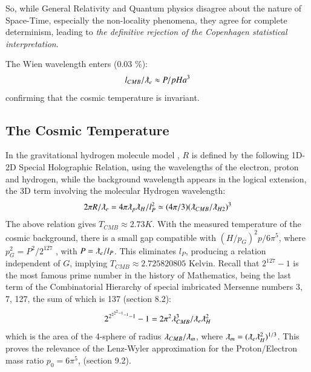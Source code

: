 \documentclass[twoside,draft]{article}
\begin{document}
\begin{sloppypar}
So, while General Relativity and Quantum physics disagree about the nature of Space-Time, especially the non-locality phenomena, they agree for complete determinism, leading to \textit{the definitive rejection of the
Copenhagen statistical interpretation}. 

The Wien wavelength enters (0.03 \%):
\begin{equation}
l_{CMB} / \lambdabar_e \approx P/pH a^3
\end{equation}
confirming that the cosmic temperature is invariant. 

\subsection{The Cosmic Temperature}

In the gravitational hydrogen molecule model \cite{Sanchez1}, $R$ is defined by the following 1D-2D Special
Holographic Relation, using the wavelengths of the electron, proton and hydrogen, while the background wavelength appears in the logical extension, the 3D term involving the molecular Hydrogen wavelength:
\begin{equation}
2 \pi R/\lambdabar_{e} = 4 \pi \lambdabar_{p} \lambdabar_{H} /l_{P}^2 \simeq (4\pi/3)(\lambdabar_{CMB} /\lambdabar_{H2})^{3}
\end{equation}
The above relation gives $T_{CMB} \approx 2.73 K$. With the measured temperature of the cosmic
background, there is a small gap compatible with $(H/p_G)^2 p/6\pi^5 $, where $p_{G}^{2} = P^{2} /2^{127}$ , with $P = \lambdabar_{e} /l_{P}$. 
This eliminates $l_{P}$, producing a relation independent of $G$, implying $T_{CMB} \approx 2.725820805$ Kelvin. Recall
that $2^{127} - 1$ is the most famous prime number in the history of Mathematics, being the last term of
the Combinatorial Hierarchy \cite{Sanchez1} of special imbricated Mersenne numbers 3, 7, 127, the sum of which is 137 (section 8.2):
\begin{equation}
2^{2^{{2^{2^2 - 1}-1}}-1}-1 = 2\pi^{2} \lambda_{CMB}^{3} /\lambdabar_{e} \lambdabar_{H}^2   
\end{equation}
which is the area of the 4-sphere of radius $\lambda_{CMB} / \lambdabar_{m}$, where $\lambdabar_{m} = (\lambdabar_{e} \lambdabar_{H}^2)^{1/3} $. This proves the relevance of
the Lenz-Wyler approximation for the Proton/Electron mass ratio $p_0 = 6\pi^{5}$, (section 9.2). 


\end{sloppypar}
\end{document}
